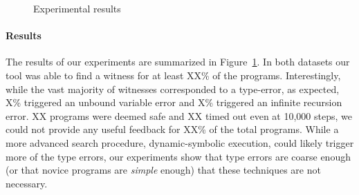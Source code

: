\begin{figure}[t]

\caption{Experimental results}
\label{fig:results-witness}
\end{figure}

\paragraph{Results}
\label{sec:results-witness}
The results of our experiments are summarized in
Figure~\ref{fig:results-witness}.
%
In both datasets our tool was able to find a witness for at least XX\%
of the programs.
%
Interestingly, while the vast majority of witnesses corresponded to a
type-error, as expected, X\% triggered an unbound variable error and X\%
triggered an infinite recursion error.
%
XX programs were deemed safe and XX timed out even at 10,000 steps, \ie
we could not provide any useful feedback for XX\% of the total programs.
%
While a more advanced search procedure, \eg dynamic-symbolic execution,
could likely trigger more of the type errors, our experiments show that
type errors are coarse enough (or that novice programs are \emph{simple}
enough) that these techniques are not necessary.



